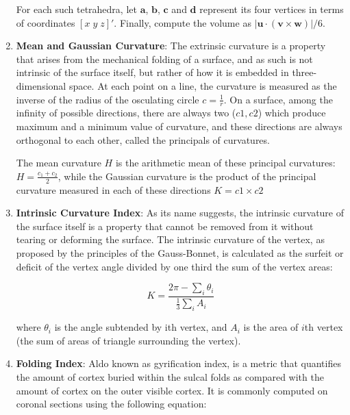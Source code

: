 \documentclass{cys}
\begin{document}
\begin{enumerate}
For each such tetrahedra, let $\mathbf{a}$, $\mathbf{b}$, $\mathbf{c}$ and $\mathbf{d}$ represent its four vertices in terms of coordinates $[x\;y\;z]'$. Finally, compute the volume as $|\mathbf{u}\cdot(\mathbf{v} \times \mathbf{w})|/6$.%
\\
\item \textbf{Mean and Gaussian Curvature}: The extrinsic curvature is a property that arises from the mechanical folding of a surface, and as such is not intrinsic of the surface itself, but rather of how it is embedded in three-dimensional space. At each point on a line, the curvature is measured as the inverse of the radius of the osculating circle $c=\frac{1}{r}$. On a surface, among the infinity of possible directions, there are always two ($c1, c2$) which produce maximum and a minimum value of curvature, and these directions are always orthogonal to each other, called the principals of curvatures. 

The mean curvature $H$ is the arithmetic mean of these principal curvatures: $H=\frac{c_1+c_2}{2}$, while the Gaussian curvature is  the product of the principal curvature measured in each of these directions $K = c1 \times c2$
\\
\item \textbf{Intrinsic Curvature Index}: As its name suggests, the intrinsic curvature of the surface itself is a property that cannot be removed from it without tearing or deforming the surface. The intrinsic curvature of the vertex, as proposed by  the principles of the Gauss-Bonnet, is calculated as the surfeit or deficit of the vertex angle divided by one third the sum of the vertex areas:

\begin{equation}
K=\frac{2\pi-\sum_i\theta_i}{\frac{1}{3}\sum_iA_i}
\end{equation}

where $\theta_i$ is the angle subtended by ith vertex, and $A_i$
is the area of $i$th vertex (the sum of areas of triangle
surrounding the vertex).
\\
\item \textbf{Folding Index}: Aldo known as gyrification index, is a metric that quantifies the amount of cortex buried within the sulcal folds as compared with the amount of cortex on the outer visible cortex. It is commonly computed on coronal sections using the following equation:


\end{enumerate}
\end{document}
